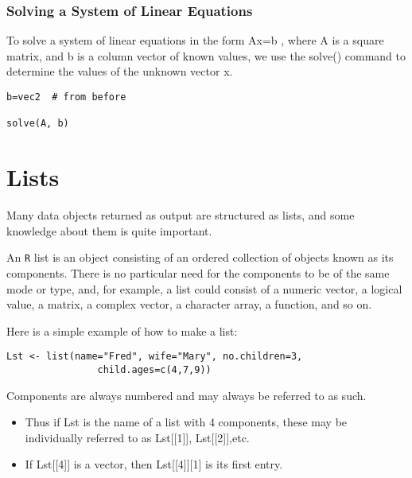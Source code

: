 \documentclass[a4paper,12pt]{article}
\begin{document}
\subsubsection{Solving a System of Linear Equations}

To solve a system of linear equations in the form Ax=b , where A is a square matrix, 
and b is a column vector of known values, we use the solve() command to determine 
the values of the unknown vector x.


\begin{framed}
\begin{verbatim}
b=vec2  # from before

solve(A, b)

\end{verbatim}
\end{framed}


\section{Lists}
Many data objects returned as output are structured as lists, and some knowledge about them is quite important.

An  \texttt{R} list is an object consisting of an ordered collection of objects known as its components. There is no particular need for the components to be of the same mode or type, and, for example, a list could consist of a numeric vector, a logical value, a matrix, a complex vector, a character array, a function, and so on.

Here is a simple example of how to make a list:
\begin{framed}
\begin{verbatim}
Lst <- list(name="Fred", wife="Mary", no.children=3,                   
                child.ages=c(4,7,9))
\end{verbatim}
\end{framed}

Components are always numbered and may always be referred to as such.
\begin{itemize}
\item Thus if Lst is the name of a list with 4 components, these may be individually referred to as Lst[[1]], Lst[[2]],etc.
\item If Lst[[4]] is a vector, then Lst[[4]][1] is its first entry.
\end{itemize}
\end{document}
